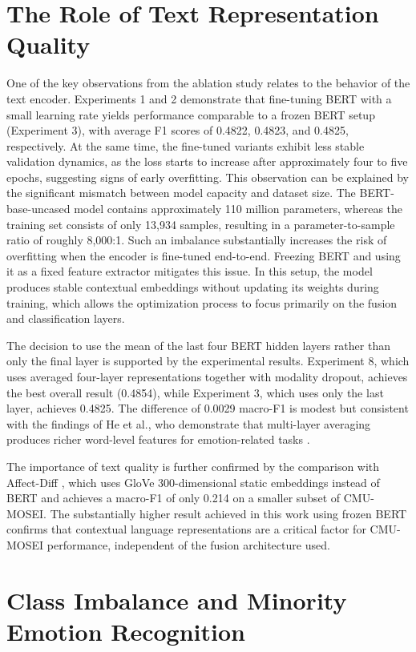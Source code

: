 \section{The Role of Text Representation Quality}
One of the key observations from the ablation study relates to the behavior of the text encoder. Experiments 1 and 2 demonstrate that fine-tuning BERT with a small learning rate yields performance comparable to a frozen BERT setup (Experiment 3), with average F1 scores of 0.4822, 0.4823, and 0.4825, respectively. At the same time, the fine-tuned variants exhibit less stable validation dynamics, as the loss starts to increase after approximately four to five epochs, suggesting signs of early overfitting.
This observation can be explained by the significant mismatch between model capacity and dataset size. The BERT-base-uncased model contains approximately 110 million parameters, whereas the training set consists of only 13,934 samples, resulting in a parameter-to-sample ratio of roughly 8,000:1. Such an imbalance substantially increases the risk of overfitting when the encoder is fine-tuned end-to-end.
Freezing BERT and using it as a fixed feature extractor mitigates this issue. In this setup, the model produces stable contextual embeddings without updating its weights during training, which allows the optimization process to focus primarily on the fusion and classification layers.

The decision to use the mean of the last four BERT hidden layers rather than only the final layer is supported by the experimental results. Experiment 8, which uses averaged four-layer representations together with modality dropout, achieves the best overall result (0.4854), while Experiment 3, which uses only the last layer, achieves 0.4825. The difference of 0.0029 macro-F1 is modest but consistent with the findings of He et al., who demonstrate that multi-layer averaging produces richer word-level features for emotion-related tasks \cite{he2024domain}.

The importance of text quality is further confirmed by the comparison with Affect-Diff \cite{sanjyal2026affectdiff}, which uses GloVe 300-dimensional static embeddings instead of BERT and achieves a macro-F1 of only 0.214 on a smaller subset of CMU-MOSEI. The substantially higher result achieved in this work using frozen BERT confirms that contextual language representations are a critical factor for CMU-MOSEI performance, independent of the fusion architecture used.

\section{Class Imbalance and Minority Emotion Recognition}


